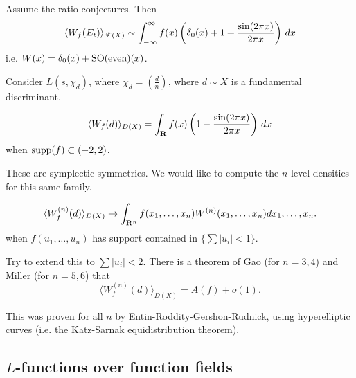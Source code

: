 \begin{theorem}
Assume the ratio conjectures. Then 
\[
  \langle W_f(E_t)\rangle_{\mathscr{F}(X)} \sim \int_{-\infty}^\infty f(x) \left(\delta_0(x)+1+\frac{\sin(2\pi x)}{2\pi x}\right)\, dx 
\]
i.e. $W(x)=\delta_0(x)+\operatorname{SO}(\text{even})(x)$. 
\end{theorem}

\begin{example}
Consider $L(s,\chi_d)$, where $\chi_d=\left(\frac d n\right)$, where 
$d\sim X$ is a fundamental discriminant. 
\end{example}

\begin{theorem}
\[
  \langle W_f(d)\rangle_{D(X)} = \int_{\mathbf{R}} f(x)\left(1-\frac{\sin(2\pi x)}{2\pi x}\right)\, dx 
\]
when $\operatorname{supp}(f)\subset (-2,2)$. 
\end{theorem}

These are symplectic symmetries. We would like to compute the $n$-level 
densities for this same family. 

\begin{theorem}[Rubenstein]
\[
  \langle W_f^{(n)}(d)\rangle_{D(X)} \to \int_{\mathbf{R}^n} f(x_1,\dots,x_n)  W^{(n)}(x_1,\dots,x_n) dx_1,\dots,x_n .
\]
when $\hat f(u_1,\dots,u_n)$ has support contained in 
$\{\sum |u_i|<1\}$. 
\end{theorem}

Try to extend this to $\sum |u_i|<2$. There is a theorem of Gao (for $n=3,4$) 
and Miller (for $n=5,6$) that 
\[
  \langle W_f^{(n)}(d)\rangle_{D(X)} = A(f) + o(1) .
\]

\begin{theorem}
This was proven for all $n$ by Entin-Roddity-Gershon-Rudnick, using 
hyperelliptic curves (i.e. the Katz-Sarnak equidistribution theorem). 
\end{theorem}





\subsection{\texorpdfstring{$L$}{L}-functions over function fields}

